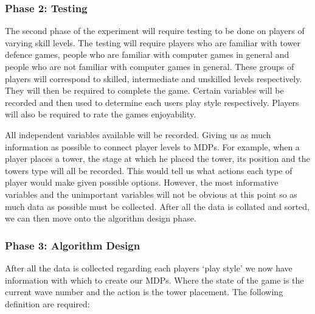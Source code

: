 \documentclass[11pt]{article}
\begin{document}
\subsubsection{Phase 2: Testing}

The second phase of the experiment will require testing to be done on players of varying skill levels. The testing will require players who are familiar with tower defence games, people who are familiar with computer games in general and people who are not familiar with computer games in general. These groups of players will correspond to skilled, intermediate and unskilled levels respectively. They will then be required to complete the game. Certain variables will be recorded and then used to determine each users play style respectively. Players will also be required to rate the games enjoyability.
\vspace{6.0 mm}

All independent variables available will be recorded. Giving us as much information as possible to connect player levels to MDPs. For example, when a player places a tower, the stage at which he placed the tower, its position and the towers type will all be recorded. This would tell us what actions each type of player would make given possible options. However, the most informative variables and the unimportant variables will not be obvious at this point so as much data as possible must be collected. After all the data is collated and sorted, we can then move onto the algorithm design phase.
\vspace{6.0 mm}

\subsubsection{Phase 3: Algorithm Design}

After all the data is collected regarding each players `play style' we now have information with which to create our MDPs. Where the state of the game is the current wave number and the action is the tower placement. The following definition are required:
\vspace{6.0 mm}
\end{document}
